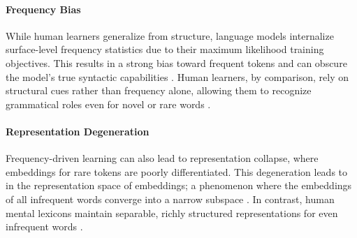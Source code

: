 \paragraph{Frequency Bias} While human learners generalize from structure, language models internalize surface-level frequency statistics due to their maximum likelihood training objectives. This results in a strong bias toward frequent tokens and can obscure the model's true syntactic capabilities \citep{feldman2020does, haviv2023understanding}. Human learners, by comparison, rely on structural cues rather than frequency alone, allowing them to recognize grammatical roles even for novel or rare words \citep{tomasello2003constructing, clark2020emergence}.

\paragraph{Representation Degeneration} Frequency-driven learning can also lead to representation collapse, where embeddings for rare tokens are poorly differentiated. This degeneration leads to  in the representation space of embeddings; a phenomenon where the embeddings of all infrequent words converge into a narrow subspace \citep{ethayarajh2019contextual}. In contrast, human mental lexicons maintain separable, richly structured representations for even infrequent words \citep{murphy2002bigbook}.




